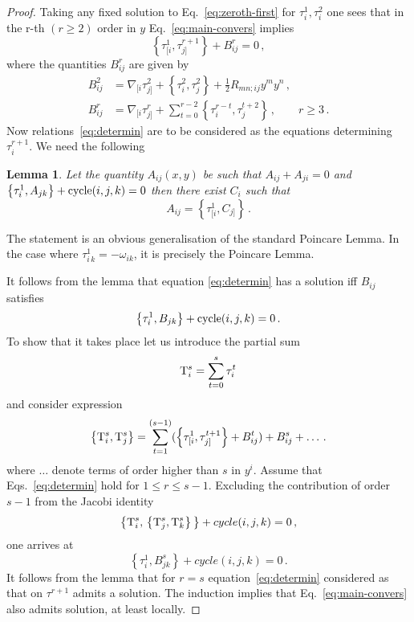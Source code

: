 \documentclass[a4paper,11pt,oneside]{amsart}
\theoremstyle{plain}
\numberwithin{equation}{section} %
\numberwithin{figure}{section} %
\newtheorem{lemma}{Lemma}[section]
\newcommand{\pb}[2]{\left\{{}#1{},{}#2{}\right\}}
\def\half{\frac{1}{2}}
\def\cT{{\rm T}}
\begin{document}
\begin{proof}
\noindent
Taking any fixed solution to Eq.~\eqref{eq:zeroth-first} for
$\tau^1_i,\tau^2_i$ one sees that in the r-th $(r\geq2)$ order in $y$
Eq.~\eqref{eq:main-convers} implies
\begin{equation} \label{eq:determin}
\pb{\tau^1_{[ i}}{\tau^{r+1}_{j ]}}+B^r_{ij}=0\,,
\end{equation}
where the quantities $B^{r}_{ij}$ are given by
\begin{equation} \begin{split}
\label{eq:B^n}
B^2_{ij}&=\nabla_{[ i}\tau^2_{ j ]}+ \pb{\tau^2_{i}}{\tau^2_{j}}+
\half R_{mn;ij}y^m y^n\,,\\
B^r_{ij}&=\nabla_{[ i} \tau^r_{j ]}+
\sum_{t=0}^{r-2} \pb{\tau_i^{r-t}}{\tau_j^{t+2}}\,, \qquad r \geq 3 \,.
\end{split}
\end{equation}
Now relations~\eqref{eq:determin} are to be considered as the equations
determining $\tau^{r+1}_i$.
We need the following
\begin{lemma}
Let the quantity $A_{ij}(x,y)$ be such that $A_{ij}+A_{ji}=0$ and
$\pb{\tau^1_i}{A_{jk}}+{\rm cycle}(i,j,k)=0$ then
there exist $C_{i}$ such that
\begin{equation}
A_{ij}=\pb{\tau^1_{[i}}{C_{j]}}\,.
\end{equation}
\end{lemma}
\noindent
The statement is an obvious generalisation of the standard
Poincare Lemma. In the case where $\tau^1_{i\,k}=-\omega_{ik}$,
it is precisely the Poincare Lemma.

\noindent
It follows from the lemma that equation
\eqref{eq:determin} has a solution iff $B_{ij}$
satisfies
\begin{equation}
\pb{\tau^1_i}{B_{jk}}+{\rm cycle}(i,j,k)=0\,.
\end{equation}
To show that it takes place let us introduce the partial sum
\begin{equation}
  \cT^s_i=\sum_{t=0}^s \tau^t_i
\end{equation}
and consider expression
\begin{equation}
  \pb{\cT^s_i}{\cT^s_j}=\sum_{t=1}^{(s-1)}
(\pb{\tau^1_{[ i}}{\tau^{t+1}_{j ]}}+
B^t_{ij})+B^s_{ij}+ \ldots \,.
\end{equation}
where $\ldots$ denote terms of order higher
than $s$ in $y^i$.  Assume that Eqs.~\eqref{eq:determin}
hold for $1 \leq r \leq s-1$.  Excluding the contribution of
order $s-1$ from the Jacobi
identity
\begin{equation}
  \pb{\cT^s_i}{\pb{\cT^s_j}{\cT^s_k}}+cycle(i,j,k)=0\,,
\end{equation}
one arrives at
\begin{equation}
  \label{eq:comp}
\pb{\tau^1_i}{B^s_{jk}}+cycle(i,j,k)=0\,.
\end{equation}
It follows from the lemma that for $r=s$ equation~\eqref{eq:determin}
considered as that on $\tau^{r+1}$  admits a
solution.  The induction implies that Eq.~\eqref{eq:main-convers}
also admits solution, at least locally.


\end{proof}
\end{document}
